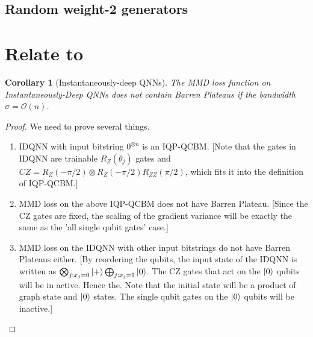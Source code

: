 \documentclass[a4paper,onecolumn,notitlepage,nofootinbib,longbibliography,superscriptaddress, floatfix, pra, aps, 10pt]{revtex4-2}
\newcommand{\cmt}[1]{{\color{blue}[#1]}}
\newcommand{\vttheta}{{\bm{\theta}}}
\newtheorem{corollary}{Corollary}
\begin{document}
\subsection{Random weight-2 generators}


\section{Relate to \cite{huang2025generativequantumadvantageclassical}}
\begin{corollary}[Instantaneously-deep QNNs]
The MMD loss function on Instantaneously-Deep QNNs \cite{huang2025generativequantumadvantageclassical} does not contain Barren Plateaus if the bandwidth $\sigma = \mathcal{O}(n)$.
\end{corollary}
\begin{proof}
We need to prove several things. \begin{enumerate} \item IDQNN with input bitstring $0^{\otimes n}$ is an IQP-QCBM. \cmt{Note that the gates in IDQNN are trainable $R_Z(\theta_j)$ gates and $CZ = R_Z(-\pi/2) \otimes R_Z(-\pi/2) R_{ZZ}(\pi/2)$, which fits it into the definition of IQP-QCBM.}
\item MMD loss on the above IQP-QCBM does not have Barren Plateau. \cmt{Since the CZ gates are fixed, the scaling of the gradient variance will be exactly the same as the 'all single qubit gates' case.} 
\item MMD loss on the IDQNN with other input bitstrings do not have Barren Plateaus either. \cmt{By reordering the qubits, the input state of the IDQNN is written as $\bigotimes_{j:x_j=0} \ket{+} \bigoplus_{j:x_j=1}\ket{0}$. The CZ gates that act on the $\ket{0}$ qubits will be in active. Hence the. Note that the initial state will be a product of graph state and $\ket{0}$ states. The single qubit gates on the $\ket{0}$ qubits will be inactive.}
\end{enumerate}
\end{proof}

\end{document}

